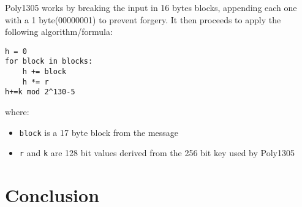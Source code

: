 \documentclass[twocolumn]{article}
\begin{document}
Poly1305 works by breaking the input in 16 bytes blocks, appending each one with a 1 byte(00000001) to prevent forgery. It then proceeds to apply the following 
algorithm/formula:

\begin{verbatim}
h = 0
for block in blocks:
    h += block
    h *= r
h+=k mod 2^130-5
\end{verbatim}

where:
\begin{itemize}
    \item \texttt{block} is a 17 byte block from the message 
    \item \texttt{r} and \texttt{k} are 128 bit values derived from the 256 bit key used by Poly1305
\end{itemize}


\section{Conclusion}

\printbibliography
\end{document}
